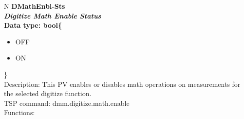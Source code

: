 \documentclass[openany]{article}
\begin{document}
		\begin{tabular}{N}
			\hline
			\bfseries DMathEnbl-Sts\label{pv:dmathenbl-sts} \\ \hline
			\emph{Digitize Math Enable Status} \\
			Data type: bool\{\begin{itemize}[noitemsep]
				\small
				\item[] OFF
				\item[] ON
			\end{itemize}\} \\
			Description: This PV enables or disables math operations on measurements for the selected digitize function. \\
			TSP command: dmm.digitize.math.enable \\
			Functions: \\
			\arrayrulecolor{\FuncTableBorderColor}

		\end{tabular}
\end{document}
